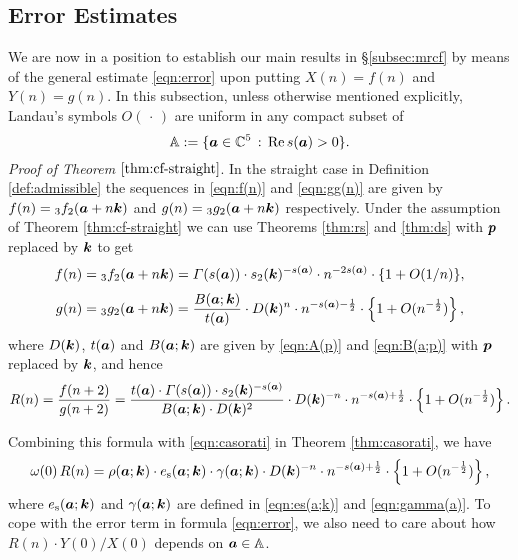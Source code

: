 \documentclass[a4paper,12pt]{article}
\theoremstyle{plain}
\def\rs{\mathrm{s}}
\def\rRe{\mathrm{Re}}
\def\A{\mathbb{A}}
\def\C{\mathbb{C}}
\def\vG{\varGamma}
\def\ba{\mbox{\boldmath $a$}}
\def\sba{\mbox{\boldmath ${\scriptstyle a}$}}
\def\bk{\mbox{\boldmath $k$}}
\def\bp{\mbox{\boldmath $p$}}
\begin{document}
\subsection{Error Estimates} \label{subsec:error}
We are now in a position to establish our main results in \S \ref{subsec:mrcf} by 
means of the general estimate \eqref{eqn:error} upon putting $X(n) = f(n)$ and 
$Y(n) = g(n)$. 
In this subsection, unless otherwise mentioned explicitly, Landau's symbols 
$O(\, \cdot \,)$ are uniform in any compact subset of 
\[
\A := \{ \ba \in \C^5 \,:\, \rRe \, s(\ba) > 0\}. 
\]
{\it Proof of Theorem $\ref{thm:cf-straight}$}. 
In the straight case in Definition \ref{def:admissible} the sequences in 
\eqref{eqn:f(n)} and \eqref{eqn:gg(n)} are given by 
$f(n) = {}_3f_2(\ba + n \bk)$ and $g(n) = {}_3g_2(\ba + n \bk)$ respectively.  
Under the assumption of Theorem \ref{thm:cf-straight} we can use   
Theorems \ref{thm:rs} and \ref{thm:ds} with $\bp$ replaced by $\bk$ 
to get    
\begin{align*}
f(n) &= {}_3f_2(\ba + n \bk) = \vG(s(\ba)) \cdot s_2(\bk)^{-s(\sba)} \cdot 
n^{-2 s(\sba)} \cdot \{1 + O(1/n) \}, \\[1mm]
g(n) &= {}_3g_2(\ba + n \bk) = \dfrac{B(\ba; \bk)}{t(\ba)} \cdot D(\bk)^n \cdot 
n^{-s(\sba)-\frac{1}{2} } \cdot \left\{ 1 + O(n^{-\frac{1}{2} }) \right\},  
\end{align*}
where $D(\bk)$, $t(\ba)$ and $B(\ba; \bk)$ are given by \eqref{eqn:A(p)} and 
\eqref{eqn:B(a;p)} with $\bp$ replaced by $\bk$, and hence 
\[
R(n) = \frac{f(n+2)}{g(n+2)} = 
\dfrac{ t(\ba) \cdot \vG(s(\ba)) \cdot s_2(\bk)^{-s(\sba)}}{ B(\ba; \bk) \cdot D(\bk)^2 } 
\cdot D(\bk)^{-n} \cdot n^{-s(\sba)+ \frac{1}{2} } \cdot 
\left\{1 + O(n^{-\frac{1}{2}}) \right\}.  
\]
\par
Combining this formula with \eqref{eqn:casorati} in Theorem 
\ref{thm:casorati}, we have  
\[
\omega(0) \, R(n) = \rho(\ba; \bk) \cdot e_{\rs}(\ba; \bk) \cdot 
\gamma(\ba; \bk) \cdot D(\bk)^{-n} \cdot n^{-s(\sba) + \frac{1}{2} } 
\cdot \left\{1 + O(n^{-\frac{1}{2} }) \right\}, 
\]
where $e_{\rs}(\ba; \bk)$ and $\gamma(\ba; \bk)$ are defined in  
\eqref{eqn:es(a;k)} and \eqref{eqn:gamma(a)}. 
To cope with the error term in formula \eqref{eqn:error}, we also need to 
care about how $R(n) \cdot Y(0)/ X(0)$ depends on $\ba \in \A$.  
\end{document}
